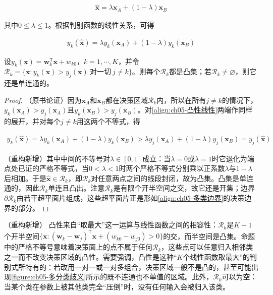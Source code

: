 \documentclass[../../main.tex]{subfiles}
\begin{document}
\begin{align}
  \hat{\boldsymbol{x}}=\lambda\boldsymbol{x}_A+(1-\lambda)\boldsymbol{x}_B
  \label{align:ch05-凸组合}
\end{align}

其中$0\leqslant\lambda\leqslant 1$。根据判别函数的线性关系，可得

\begin{align}
  y_k(\hat{\boldsymbol{x}})=\lambda y_k(\boldsymbol{x}_A)+(1-\lambda)y_k(\boldsymbol{x}_B)
  \label{align:ch05-凸性线性}
\end{align}

\begin{proposition}[多类线性判别式的决策区域是凸的]\label{proposition:ch05-多类决策区域凸性}
设$y_k(\boldsymbol{x})=\boldsymbol{w}_k^{\mathsf{T}}\boldsymbol{x}+w_{k0}$，$k=1,\cdots,K$，并令$\mathcal{R}_k=\{\boldsymbol{x}:y_k(\boldsymbol{x})>y_j(\boldsymbol{x})\ \text{对一切}\ j\neq k\}$。则每个$\mathcal{R}_k$都是凸集；若$\mathcal{R}_k\neq\varnothing$，则它还是单连通的。
\end{proposition}

\begin{proof}
（原书论证）因为$\boldsymbol{x}_A$和$\boldsymbol{x}_B$都在决策区域$\mathcal{R}_k$内，所以在所有$j\neq k$的情况下，$y_k(\boldsymbol{x}_A)>y_j(\boldsymbol{x}_A)$且$y_k(\boldsymbol{x}_B)>y_j(\boldsymbol{x}_B)$。对\eqref{align:ch05-凸性线性}两端作同样的展开，并对每个$j\neq k$用这两个不等式，得

\begin{align}
  y_k(\hat{\boldsymbol{x}})=\lambda y_k(\boldsymbol{x}_A)+(1-\lambda)y_k(\boldsymbol{x}_B)>\lambda y_j(\boldsymbol{x}_A)+(1-\lambda)y_j(\boldsymbol{x}_B)=y_j(\hat{\boldsymbol{x}})
\end{align}

（重构新增）其中中间的不等号对$\lambda\in[0,1]$成立：当$\lambda=0$或$\lambda=1$时它退化为端点处已证的严格不等式，当$0<\lambda<1$时两个严格不等式分别乘以正系数$\lambda$与$1-\lambda$后相加。于是$\hat{\boldsymbol{x}}\in\mathcal{R}_k$，即$\mathcal{R}_k$对任意两点之间的线段封闭，故为凸集。凸集是单连通的，因此$\mathcal{R}_k$单连且凸出。注意$\mathcal{R}_k$是有限个开半空间之交，故它还是开集；边界$\partial\mathcal{R}_k$由若干超平面片组成，这些超平面片正是形如\eqref{align:ch05-多类边界}的决策边界的部分。
\end{proof}

\begin{remark}（重构新增）
凸性来自“取最大”这一运算与线性函数之间的相容性：$\mathcal{R}_k$是$K-1$个开半空间$\{\boldsymbol{x}:(\boldsymbol{w}_k-\boldsymbol{w}_j)^{\mathsf{T}}\boldsymbol{x}+(w_{k0}-w_{j0})>0\}$的交，而半空间是凸集。命题中的严格不等号意味着决策面上的点不属于任何$\mathcal{R}_k$，这些点可以任意归入相邻类之一而不改变决策区域的凸性。需要强调，凸性是这种“$K$个线性函数取最大”的判别式所特有的：若改用一对一或一对多组合，决策区域一般不是凸的，甚至可能出现\cref{figure:ch05-多分类歧义}所示的既不连通也不单值的区域。此外，$\mathcal{R}_k$可以为空：当某个类在参数上被其他类完全“压倒”时，没有任何输入会被归入该类。
\end{remark}
\end{document}
